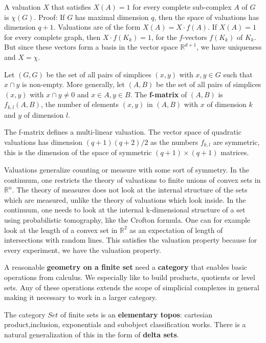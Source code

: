 \documentclass[12pt]{amsart}
\begin{document}
\vspace{3mm}
A valuation $X$ that satisfies $X(A)=1$ for every complete sub-complex $A$ of $G$
is $\chi(G)$.  Proof: If $G$ has maximal dimension $q$, then the space of valuations has dimension $q+1$.
Valuations are of the form $X(A) = X \cdot f(A)$.
If $X(A)=1$ for every complete graph, then $X \cdot f(K_k) = 1$, for the
$f$-vectors $f(K_k)$ of $K_k$. But since these vectors form a basis in the
vector space $\mathbb{R}^{d+1}$, we have uniqueness and $X=\chi$.

\vspace{3mm}
Let $(G,G)$ be the set of all pairs of simplices $(x,y)$ with 
$x,y \in G$ such that $x \cap y$ is non-empty. 
More generally, let $(A,B)$ be the set of all pairs of simplices
$(x,y)$ with $x \cap y \neq 0$ and $x \in A, y \in B$. 
The {\bf f-matrix} of $(A,B)$ is $f_{k,l}(A,B)$, the number of elements
$(x,y)$ in $(A,B)$ with $x$ of dimension $k$ and $y$ of dimension $l$. 

\vspace{3mm}
The f-matrix defines a multi-linear valuation. The vector space of quadratic
valuations has dimension $(q+1)(q+2)/2$ as the numbers $f_{k,l}$ are symmetric,
this is the dimension of the space of symmetric $(q+1) \times (q+1)$ matrices. 

\vspace{3mm}
Valuations generalize counting or measure with some sort of symmetry. 
In the continuum, one restricts the theory of valuations to finite unions of
convex sets in $\mathbb{R}^n$.   %
The theory of measures does not look at the internal structure 
of the sets which are measured, unlike the theory of valuations which look inside. 
In the continuum, one needs to look at the internal k-dimensional structure of a set using 
probabilistic tomography, like the Crofton formula. One can for example look at the length
of a convex set in $\mathbb{R}^2$ as an expectation of length of intersections with random 
lines. This satisfies the valuation property because for every experiment, we have the
valuation property. 

\vspace{3mm}
A reasonable {\bf geometry on a finite set} need a {\bf category} that enables
basic operations from calculus. We especially like to build products, quotients
or level sets. Any of these operations extends the scope of simplicial complexes
in general making it necessary to work in a larger category.

\vspace{3mm}
The category $Set$ of finite sets is an {\bf elementary topos}:
cartesian product,inclusion, exponentials and subobject classification works.
There is a natural generalization of this in the form of {\bf delta sets}.
\end{document}
